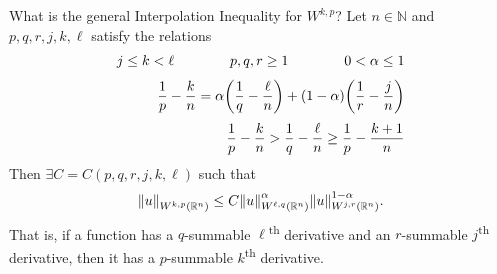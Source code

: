 \documentclass[avery5388,grid,frame]{flashcards}
\def\Rl{\mathbb{R}}
\begin{document}
\begin{flashcard}
    {What is the general Interpolation Inequality for $W^{k,p}$?}
    Let $n \in \mathbb{N}$ and $p,q,r,j,k,\ell$ satisfy the relations
    \begin{equation*}
        \begin{aligned}
            j \leq k < \ell \qquad \qquad p,q,r \geq 1 \qquad \qquad 0 < \alpha \leq 1 \\[.1cm]
            \frac{1}{p} - \frac{k}{n} = \alpha\qty(\frac{1}{q} - \frac{\ell}{n}) + \qty(1 - \alpha)\qty(\frac{1}{r} - \frac{j}{n}) \\[.1cm]
            \frac{1}{p} - \frac{k}{n} > \frac{1}{q} - \frac{\ell}{n} \geq \frac{1}{p} - \frac{k+1}{n}
        \end{aligned}
    \end{equation*}
    Then $\exists C = C(p,q,r,j,k,\ell)$ such that
    \begin{align*}
        \norm{u}_{W^{k,p}(\Rl^n)} \leq C\norm{u}_{W^{\ell,q}(\Rl^n)}^\alpha\norm{u}_{W^{j,r}(\Rl^n)}^{1-\alpha}.
    \end{align*}
    That is, if a function has a $q$-summable $\ell$\textsuperscript{th} derivative and an $r$-summable $j$\textsuperscript{th} derivative, then it has a $p$-summable $k$\textsuperscript{th} derivative.
\end{flashcard}
\end{document}

